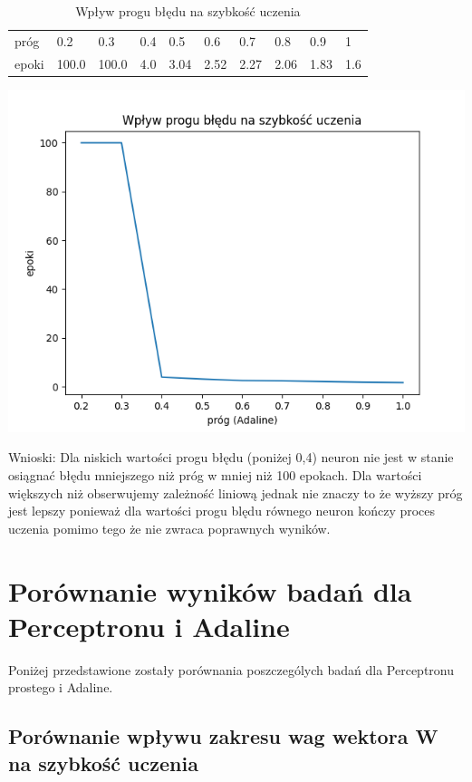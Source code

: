 \documentclass{article}
\begin{document}
\begin{table}[h]
  \centering
  \caption{Wpływ progu błędu na szybkość uczenia}
  \begin{tabular}{llllllllll}
    \toprule
    próg & 0.2 & 0.3 & 0.4 & 0.5 & 0.6 & 0.7 & 0.8 & 0.9 & 1 \\
    epoki & 100.0 & 100.0 & 4.0 & 3.04 & 2.52 & 2.27 & 2.06 & 1.83 & 1.6 \\
    \bottomrule
  \end{tabular}
\end{table}


\begin{center}
\includegraphics[scale=0.8]{ada_exp3.png}
\end{center}

Wnioski: Dla niskich wartości progu błędu (poniżej 0,4) neuron nie jest w stanie osiągnać błędu mniejszego niż próg w mniej niż 100 epokach. Dla wartości większych niż obserwujemy zależność liniową jednak nie znaczy to że wyższy próg jest lepszy ponieważ dla wartości progu blędu równego neuron kończy proces uczenia pomimo tego że nie zwraca poprawnych wyników.

\newpage
\section{Porównanie wyników badań dla Perceptronu i Adaline}
Poniżej przedstawione zostały porównania poszczególych badań dla Perceptronu prostego i Adaline.

\subsection{Porównanie wpływu zakresu wag wektora W na szybkość uczenia}
\end{document}
